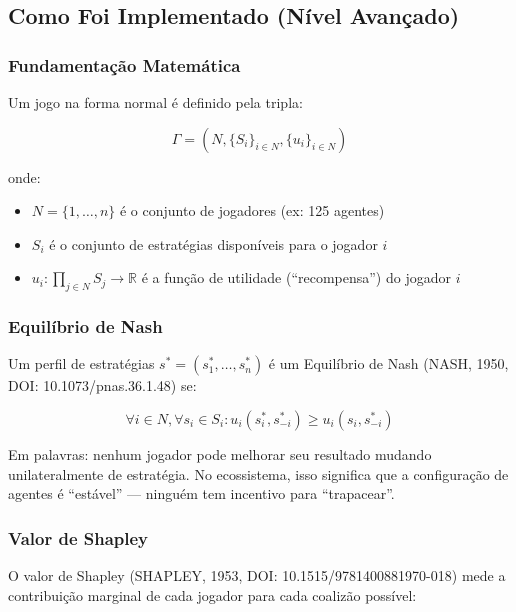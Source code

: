 \documentclass[12pt,a4paper]{article}
\begin{document}
\subsection{Como Foi Implementado (Nível Avançado)}

\subsubsection{Fundamentação Matemática}

Um jogo na forma normal é definido pela tripla:

\begin{equation}
  \Gamma = (N, \{S_i\}_{i \in N}, \{u_i\}_{i \in N})
\end{equation}

onde:
\begin{itemize}[itemsep=1pt]
  \item $N = \{1, \ldots, n\}$ é o conjunto de jogadores (ex: 125 agentes)
  \item $S_i$ é o conjunto de estratégias disponíveis para o jogador $i$
  \item $u_i: \prod_{j \in N} S_j \to \mathbb{R}$ é a função de utilidade (``recompensa'') do jogador $i$
\end{itemize}

\subsubsection{Equilíbrio de Nash}

Um perfil de estratégias $s^* = (s_1^*, \ldots, s_n^*)$ é um Equilíbrio de Nash (NASH, 1950, DOI: 10.1073/pnas.36.1.48) se:

\begin{equation}
  \forall i \in N, \forall s_i \in S_i: u_i(s_i^*, s_{-i}^*) \geq u_i(s_i, s_{-i}^*)
\end{equation}

Em palavras: nenhum jogador pode melhorar seu resultado mudando unilateralmente de estratégia. No ecossistema, isso significa que a configuração de agentes é ``estável'' --- ninguém tem incentivo para ``trapacear''.

\subsubsection{Valor de Shapley}

O valor de Shapley (SHAPLEY, 1953, DOI: 10.1515/9781400881970-018) mede a contribuição marginal de cada jogador para cada coalizão possível:
\end{document}
